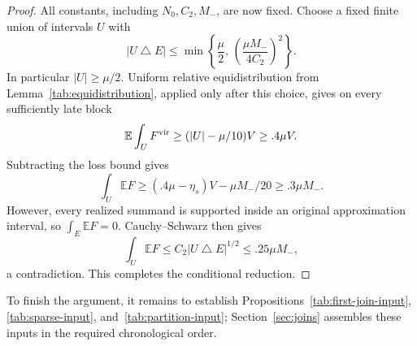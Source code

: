 \begin{proof}
All constants, including $N_0,C_2,M_-$, are now fixed.  Choose
a fixed finite union of intervals $U$ with
\[
 |U\mathbin{\triangle}E|
 \le \min\left\{\frac\mu2,\,
           \left(\frac{\mu M_-}{4C_2}\right)^2\right\}.
\]
In particular $|U|\ge\mu/2$.  Uniform relative equidistribution
from Lemma~\ref{tab:equidistribution}, applied only after this
choice, gives on every sufficiently late block
\[
 \mathbb E\int_U F^{\rm vir}
 \ge (|U|-\mu/10)V\ge .4\mu V.
\]
Subtracting the loss bound gives
\[
 \int_U\mathbb E F
 \ge (.4\mu-\eta_s)V-\mu M_-/20
 \ge .3\mu M_-.
\]  However, every realized
summand is supported inside an original approximation interval,
so $\int_E\mathbb E F=0$.  Cauchy--Schwarz then gives
\[
 \int_U\mathbb E F
 \le C_2|U\mathbin{\triangle}E|^{1/2}\le .25\mu M_-,
\]
a contradiction.  This completes the
conditional reduction.
\end{proof}

To finish the argument, it remains to establish
Propositions~\ref{tab:first-join-input}, \ref{tab:sparse-input},
and~\ref{tab:partition-input}; Section~\ref{sec:joins} assembles
these inputs in the required chronological order.
